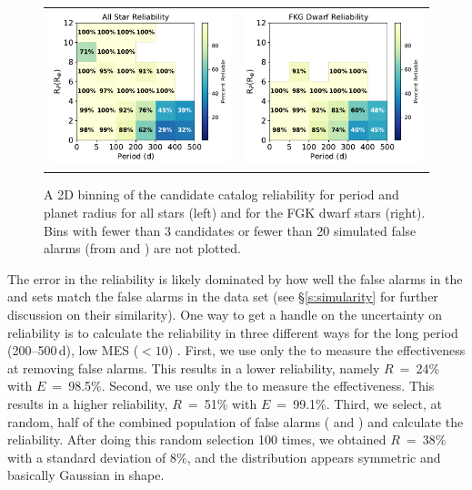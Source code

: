 \begin{figure}[htb]
\begin{center}
\begin{tabular}{cc}
\includegraphics[width=0.5\linewidth]{f11-left.pdf} &
\includegraphics[width=0.5\linewidth]{f11-right.pdf}
\end{tabular}
\caption{A 2D binning of the candidate catalog reliability for period and planet radius for all stars (left) and for the FGK dwarf stars (right). Bins with fewer than 3 candidates or fewer than 20 simulated false alarms (from \invtce{} and \scrtce{}) are not plotted.}
\label{f:prReliability}
\end{center}
\end{figure}


The error in the reliability is likely dominated by how well the false alarms in the \scrtce{} and \invtce{} sets match the false alarms in the \opstce{} data set (see \S\ref{s:simularity} for further discussion on their similarity).  One way to get a handle on the uncertainty on reliability is to calculate the reliability in three different ways for the long period (200--500\,d), low MES ($<10$) .  First, we use only the  to measure the effectiveness at removing false alarms. This results in a lower reliability, namely $R$~=~24\% with $E$~=~98.5\%. Second, we use only the  to measure the effectiveness. This results in a higher reliability, $R$~=~51\% with $E$~=~99.1\%. Third, we select, at random, half of the combined population of false alarms (\scrtce{} and \invtce{}) and calculate the reliability. After doing this random selection 100 times, we obtained $R$~=~38\% with a standard deviation of 8\%, and the distribution appears symmetric and basically Gaussian in shape.  

